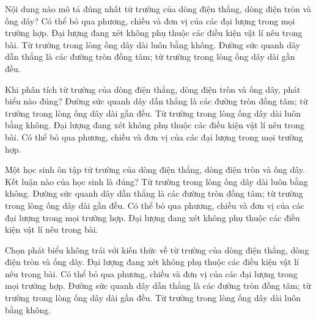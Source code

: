 \begin{ex}
Nội dung nào mô tả đúng nhất từ trường của dòng điện thẳng, dòng điện tròn và ống dây?
\choice
{Có thể bỏ qua phương, chiều và đơn vị của các đại lượng trong mọi trường hợp.}
{Đại lượng đang xét không phụ thuộc các điều kiện vật lí nêu trong bài.}
{Từ trường trong lòng ống dây dài luôn bằng không.}
{\True Đường sức quanh dây dẫn thẳng là các đường tròn đồng tâm; từ trường trong lòng ống dây dài gần đều.}
\end{ex}

\begin{ex}
Khi phân tích từ trường của dòng điện thẳng, dòng điện tròn và ống dây, phát biểu nào đúng?
\choice
{\True Đường sức quanh dây dẫn thẳng là các đường tròn đồng tâm; từ trường trong lòng ống dây dài gần đều.}
{Từ trường trong lòng ống dây dài luôn bằng không.}
{Đại lượng đang xét không phụ thuộc các điều kiện vật lí nêu trong bài.}
{Có thể bỏ qua phương, chiều và đơn vị của các đại lượng trong mọi trường hợp.}
\end{ex}

\begin{ex}
Một học sinh ôn tập từ trường của dòng điện thẳng, dòng điện tròn và ống dây. Kết luận nào của học sinh là đúng?
\choice
{Từ trường trong lòng ống dây dài luôn bằng không.}
{\True Đường sức quanh dây dẫn thẳng là các đường tròn đồng tâm; từ trường trong lòng ống dây dài gần đều.}
{Có thể bỏ qua phương, chiều và đơn vị của các đại lượng trong mọi trường hợp.}
{Đại lượng đang xét không phụ thuộc các điều kiện vật lí nêu trong bài.}
\end{ex}

\begin{ex}
Chọn phát biểu không trái với kiến thức về từ trường của dòng điện thẳng, dòng điện tròn và ống dây.
\choice
{Đại lượng đang xét không phụ thuộc các điều kiện vật lí nêu trong bài.}
{Có thể bỏ qua phương, chiều và đơn vị của các đại lượng trong mọi trường hợp.}
{\True Đường sức quanh dây dẫn thẳng là các đường tròn đồng tâm; từ trường trong lòng ống dây dài gần đều.}
{Từ trường trong lòng ống dây dài luôn bằng không.}
\end{ex}
